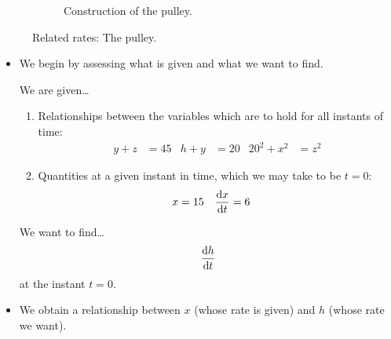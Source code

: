 \documentclass[../main.tex]{subfiles}
\begin{document}
\begin{itemize}
\begin{figure}[h!]
\begin{subfigure}[b]{0.4\linewidth}
            \caption{Construction of the pulley.}
            \label{fig:relatedrates-pulleyb}
        \end{subfigure}
        \caption{Related rates: The pulley.}
        \label{fig:relatedrates-pulley}
    \end{figure}
    \begin{itemize}
        \item We begin by assessing what is given and what we want to find.\par
        We are given\dots
        \begin{enumerate}[label={(\alph*)}]
            \item Relationships between the variables which are to hold for all instants of time:
            \begin{align*}
                y+z &= 45&
                h+y &= 20&
                20^2+x^2 &= z^2
            \end{align*}
            \item Quantities at a given instant in time, which we may take to be $t=0$:
            \begin{align*}
                x &= 15&
                \dv{x}{t} &= 6
            \end{align*}
        \end{enumerate}
        We want to find\dots
        \begin{equation*}
            \dv{h}{t}
        \end{equation*}
        at the instant $t=0$.
        \item We obtain a relationship between $x$ (whose rate is given) and $h$ (whose rate we want).

\end{itemize}
\end{itemize}
\end{document}
